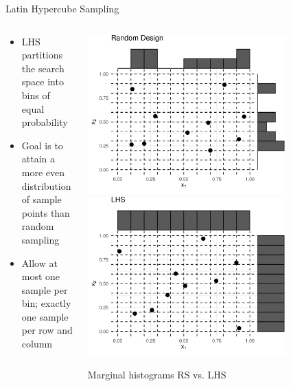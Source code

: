 \documentclass[11pt,compress,t,notes=noshow, xcolor=table]{beamer}
\begin{document}
\begin{frame}{Latin Hypercube Sampling}

\begin{columns}[T]
\begin{column}{0.5\textwidth}
\begin{itemize}
\item LHS partitions the search space into bins of equal probability
\item Goal is to attain a more even distribution of sample points than random sampling
\item Allow at most one sample per bin; exactly one sample per row and column
\end{itemize}
\end{column}

\begin{column}{0.5\textwidth}
\center
\includegraphics[width = 0.75\textwidth]{slides/010-bayesian-optimization/figure_man/init_0.png}
\includegraphics[width = 0.75\textwidth]{slides/010-bayesian-optimization/figure_man/init_1.png}\\
\begin{footnotesize}
Marginal histograms RS vs. LHS
\end{footnotesize}
\end{column}
\end{columns}

\end{frame}
\end{document}
